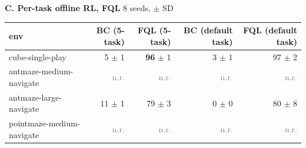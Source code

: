 \documentclass[10pt]{article}
\newcommand{\nr}{\textcolor{gray}{n.r.}}
\begin{document}
\vspace{8pt}
\noindent\textbf{C. Per-task offline RL, FQL} \hfill {\small 8 seeds, $\pm$ SD}
\begin{center}\small
\begin{tabular}{l r r r r}
\toprule
env & BC (5-task) & FQL (5-task) & BC (default task) & FQL (default task) \\
\midrule
cube-single-play        & 5 $\pm$ 1  & \textbf{96} $\pm$ 1 & 3 $\pm$ 1 & 97 $\pm$ 2 \\
antmaze-medium-navigate & \nr & \nr & \nr & \nr \\
antmaze-large-navigate  & 11 $\pm$ 1 & 79 $\pm$ 3 & 0 $\pm$ 0 & 80 $\pm$ 8 \\
pointmaze-medium-navigate & \nr & \nr & \nr & \nr \\
\bottomrule
\end{tabular}
\end{center}
\end{document}
